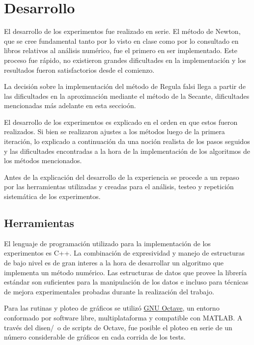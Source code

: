 
\section{Desarrollo}

El desarrollo de los experimentos fue realizado en serie. 
El m\'etodo de Newton, que se cree fundamental tanto por lo visto en clase como 
por lo consultado en libros relativos al an\'alisis num\'erico, fue el primero 
en ser implementado. Este proceso fue r\'apido, no existieron grandes 
dificultades en la implementaci\'on y los resultados fueron satisfactorios 
desde el comienzo.

La decisi\'on sobre la implementaci\'on del m\'etodo de Regula falsi llega a
partir de las dificultades en la aproximaci\'on mediante el m\'etodo de la
Secante, dificultades mencionadas m\'as adelante en esta seccio\'on.

El desarrollo de los experimentos es explicado en el orden en que estos fueron
realizados. Si bien se realizaron ajustes a los m\'etodos luego de la primera
iteraci\'on, lo explicado a continuaci\'on da una noci\'on realista de los pasos
seguidos y las dificultades encontradas a la hora de la implementaci\'on de los
algoritmos de los m\'etodos mencionados. 

Antes de la explicaci\'on del
desarrollo de la experiencia se procede a un repaso por las herramientas
utilizadas y creadas para el an\'alisis, testeo y repetici\'on sistem\'atica de
los experimentos.

\subsection{Herramientas}

El lenguaje de programaci\'on utilizado para la implementaci\'on de los
experimentos es C++. La combinaci\'on de expresividad y manejo de estructuras de
bajo nivel es de gran interes a la hora de desarrollar un algoritmo que
implementa un m\'etodo num\'erico. Las estructuras de datos que provee la
librer\'ia est\'andar son suficientes para la manipulaci\'on de los datos e
incluso para t\'ecnicas de mejora experimentales probadas durante la
realizaci\'on del trabajo.

Para las rutinas y ploteo de gr\'aficos se utiliz\'o 
\href{http://www.gnu.org/software/octave/}{GNU Octave}, un entorno conformado
por software libre, multiplataforma y compatible con MATLAB. A trav\'es del
disen/~o de scripts de Octave, fue posible el ploteo en serie de un n\'umero
considerable de gr\'aficos en cada corrida de los tests.


